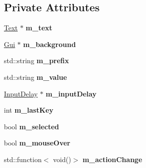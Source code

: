 \subsection*{Private Attributes}
\begin{DoxyCompactItemize}
\item 
\mbox{\label{class_flounder_1_1_input_text_ae599c067507281eb52381bc7cb8631c9}} 
\hyperlink{class_flounder_1_1_text}{Text} $\ast$ {\bfseries m\+\_\+text}
\item 
\mbox{\label{class_flounder_1_1_input_text_aec542fe921721935bdb09e2a34330504}} 
\hyperlink{class_flounder_1_1_gui}{Gui} $\ast$ {\bfseries m\+\_\+background}
\item 
\mbox{\label{class_flounder_1_1_input_text_a639f5a7f77d3ed1889af1b5b7a14809b}} 
std\+::string {\bfseries m\+\_\+prefix}
\item 
\mbox{\label{class_flounder_1_1_input_text_aa7d74c8758ebeae1c67d7ee33e4f192c}} 
std\+::string {\bfseries m\+\_\+value}
\item 
\mbox{\label{class_flounder_1_1_input_text_a0421acdc21e4849bca28f366a9310ae4}} 
\hyperlink{class_flounder_1_1_input_delay}{Input\+Delay} $\ast$ {\bfseries m\+\_\+input\+Delay}
\item 
\mbox{\label{class_flounder_1_1_input_text_ae8d6c2e590af82796361c09235afc008}} 
int {\bfseries m\+\_\+last\+Key}
\item 
\mbox{\label{class_flounder_1_1_input_text_ab0c0b8f9eaece6fdfe34be27cdb0f517}} 
bool {\bfseries m\+\_\+selected}
\item 
\mbox{\label{class_flounder_1_1_input_text_a184134803b78044523065d08b60a8211}} 
bool {\bfseries m\+\_\+mouse\+Over}
\item 
\mbox{\label{class_flounder_1_1_input_text_a5167e66cf67535e7dafbf3d60220ba03}} 
std\+::function$<$ void()$>$ {\bfseries m\+\_\+action\+Change}
\end{DoxyCompactItemize}
